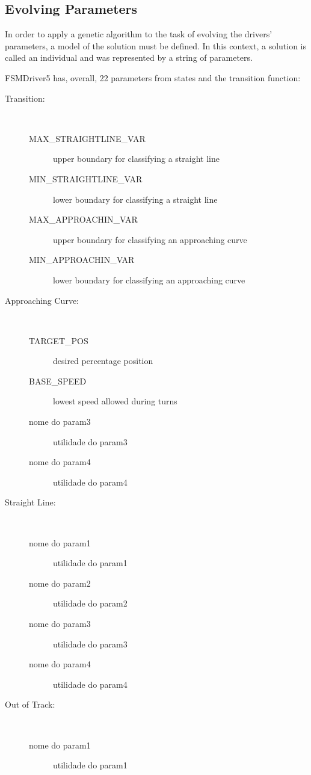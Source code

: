 \subsection{Evolving Parameters}%
In order to apply a genetic algorithm to the task of evolving the drivers' parameters, a model of the solution must be defined. In this context, a solution is called an individual and was represented by a string of parameters.

FSMDriver5 has, overall, 22 parameters from states and the transition function:

\begin{description}
	\item[Transition:] \ %
	\begin{description}
		\item[MAX_STRAIGHTLINE_VAR] upper boundary for classifying a straight line
		\item[MIN_STRAIGHTLINE_VAR] lower boundary for classifying a straight line
		\item[MAX_APPROACHIN_VAR] upper boundary for classifying an approaching curve
		\item[MIN_APPROACHIN_VAR] lower boundary for classifying an approaching curve
	\end{description}
	\item[Approaching Curve:] \ %
	\begin{description}
		\item[TARGET_POS] desired percentage position
		\item[BASE_SPEED] lowest speed allowed during turns
		\item[nome do param3] utilidade do param3
		\item[nome do param4] utilidade do param4
	\end{description}
	\item[Straight Line:] \ %
	\begin{description}
		\item[nome do param1] utilidade do param1
		\item[nome do param2] utilidade do param2
		\item[nome do param3] utilidade do param3
		\item[nome do param4] utilidade do param4
	\end{description}
	\item[Out of Track:] \ %
	\begin{description}
		\item[nome do param1] utilidade do param1

\end{description}
\end{description}
